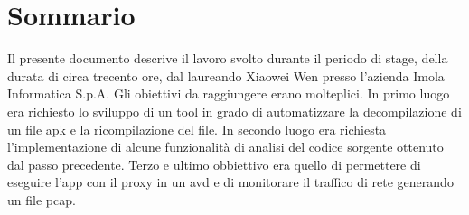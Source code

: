 
\cleardoublepage
{}
{}
\begingroup
\let\clearpage\relax
\let\cleardoublepage\relax
\let\cleardoublepage\relax

\chapter*{Sommario}

Il presente documento descrive il lavoro svolto durante il periodo di stage, della durata di circa trecento ore, dal laureando Xiaowei Wen presso l'azienda Imola Informatica S.p.A. Gli obiettivi da raggiungere erano molteplici. In primo luogo era richiesto lo sviluppo di un tool in grado di automatizzare la decompilazione di un file \gls{apk} e la ricompilazione del file. In secondo luogo era richiesta l'implementazione di alcune funzionalità di analisi del codice sorgente ottenuto dal passo precedente.
Terzo e ultimo obbiettivo era quello di permettere di eseguire l'app con il proxy in un \gls{avd} e di monitorare il traffico di rete generando un file \gls{pcap}.

%
%

\endgroup			

\vfill

